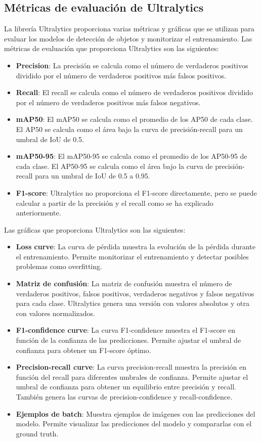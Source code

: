 \subsection{Métricas de evaluación de Ultralytics}
La librería Ultralytics proporciona varias métricas y gráficas que se utilizan para evaluar los modelos de detección de objetos y monitorizar el entrenamiento. Las métricas de evaluación que proporciona Ultralytics son las siguientes:
\begin{itemize}
    \item \textbf{Precision}: La precisión se calcula como el número de verdaderos positivos dividido por el número de verdaderos positivos más falsos positivos.
    \item \textbf{Recall}: El recall se calcula como el número de verdaderos positivos dividido por el número de verdaderos positivos más falsos negativos.
    \item \textbf{mAP50}: El mAP50 se calcula como el promedio de los AP50 de cada clase. El AP50 se calcula como el área bajo la curva de precisión-recall para un umbral de IoU de 0.5.
    \item \textbf{mAP50-95}: El mAP50-95 se calcula como el promedio de los AP50-95 de cada clase. El AP50-95 se calcula como el área bajo la curva de precisión-recall para un umbral de IoU de 0.5 a 0.95.
    \item \textbf{F1-score}: Ultralytics no proporciona el F1-score directamente, pero se puede calcular a partir de la precisión y el recall como se ha explicado anteriormente.
\end{itemize}

Las gráficas que proporciona Ultralytics son las siguientes:

\begin{itemize}
    \item \textbf{Loss curve}: La curva de pérdida muestra la evolución de la pérdida durante el entrenamiento. Permite monitorizar el entrenamiento y detectar posibles problemas como overfitting.
    \item \textbf{Matriz de confusión}: La matriz de confusión muestra el número de verdaderos positivos, falsos positivos, verdaderos negativos y falsos negativos para cada clase. Ultralytics genera una versión con valores absolutos y otra con valores normalizados.
    \item \textbf{F1-confidence curve}: La curva F1-confidence muestra el F1-score en función de la confianza de las predicciones. Permite ajustar el umbral de confianza para obtener un F1-score óptimo.
    \item \textbf{Precision-recall curve}: La curva precision-recall muestra la precisión en función del recall para diferentes umbrales de confianza. Permite ajustar el umbral de confianza para obtener un equilibrio entre precisión y recall. También genera las curvas de precision-confidence y recall-confidence.
    \item \textbf{Ejemplos de batch}: Muestra ejemplos de imágenes con las predicciones del modelo. Permite visualizar las predicciones del modelo y compararlas con el ground truth.
\end{itemize}


